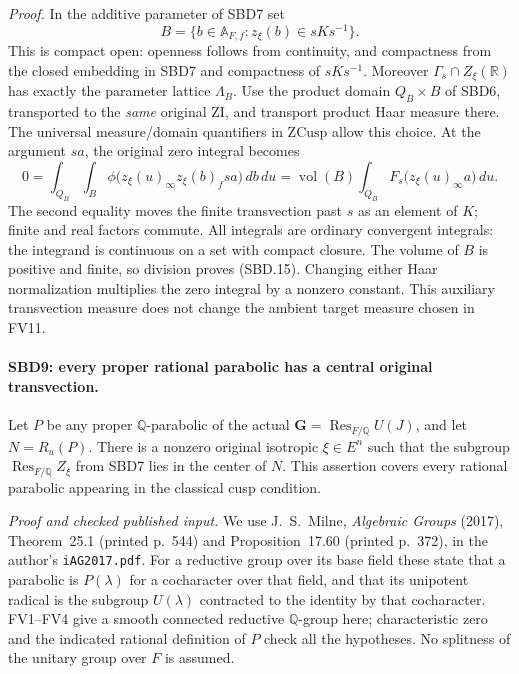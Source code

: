 \documentclass[11pt,a4paper]{article}
\numberwithin{equation}{section}
\theoremstyle{remark}\newtheorem{remark}[theorem]{Remark}
\begin{document}
\emph{Proof.}
In the additive parameter of SBD7 set
\[
 B=\{b\in\mathbb A_{F,f}:z_\xi(b)\in sKs^{-1}\}.
\]
This is compact open: openness follows from continuity, and
compactness from the closed embedding in SBD7 and compactness of
\(sKs^{-1}\).  Moreover \(\Gamma_s\cap Z_\xi(\mathbb R)\)
has exactly the parameter lattice \(\Lambda_B\).
Use the product domain \(Q_B\times B\) of SBD6, transported to
the \emph{same} original \(\mathrm{ZI}\), and transport product
Haar measure there.  The universal measure/domain quantifiers in
\(\mathrm{ZCusp}\) allow this choice.  At the argument \(sa\),
the original zero integral becomes
\[
 0=\int_{Q_B}\int_B
       \phi\bigl(z_\xi(u)_\infty z_\xi(b)_fsa\bigr)\,db\,du
   =\operatorname{vol}(B)
       \int_{Q_B}F_s\bigl(z_\xi(u)_\infty a\bigr)\,du.
 \tag{SBD.16}
\]
The second equality moves the finite transvection past \(s\)
as an element of \(K\); finite and real factors commute.
All integrals are ordinary convergent integrals: the integrand
is continuous on a set with compact closure.  The volume of
\(B\) is positive and finite, so division proves (SBD.15).
Changing either Haar normalization multiplies the zero integral
by a nonzero constant.  This auxiliary transvection measure
does not change the ambient target measure chosen in FV11.

\paragraph{SBD9: every proper rational parabolic has a central original transvection.}
\label{claim:SBD9}
Let \(P\) be any proper \(\mathbb Q\)-parabolic of the actual
\(\mathbf G=\operatorname{Res}_{F/\mathbb Q}U(J)\), and let
\(N=R_u(P)\).  There is a nonzero original isotropic
\(\xi\in E^n\) such that the subgroup
\(\operatorname{Res}_{F/\mathbb Q}Z_\xi\) from SBD7 lies in
the center of \(N\).  This assertion covers every rational
parabolic appearing in the classical cusp condition.

\emph{Proof and checked published input.}
We use J.~S.~Milne, \emph{Algebraic Groups} (2017), Theorem~25.1
(printed p.~544) and Proposition~17.60 (printed p.~372), in the
author's \texttt{i\allowbreak AG2017.\allowbreak pdf}.  For a reductive group over its
base field these state that a parabolic is \(P(\lambda)\) for a
cocharacter over that field, and that its unipotent radical is
the subgroup \(U(\lambda)\) contracted to the identity by that
cocharacter.  FV1--FV4 give a smooth connected reductive
\(\mathbb Q\)-group here; characteristic zero and the indicated
rational definition of \(P\) check all the hypotheses.  No
splitness of the unitary group over \(F\) is assumed.
\end{document}
